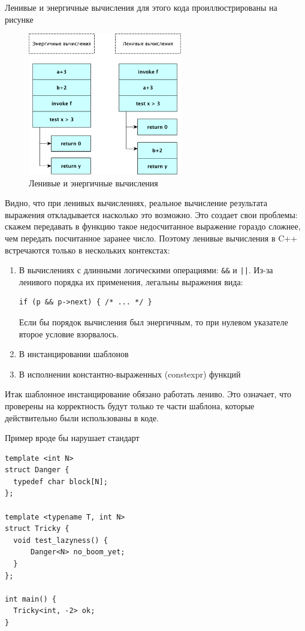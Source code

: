 \documentclass[a4paper,12pt,oneside]{article}
\begin{document}
Ленивые и энергичные вычисления для этого кода проиллюстрированы на рисунке

\begin{figure}[h!]
\centering
\includegraphics[width=0.6\textwidth]{illustrations/lazyorder-crop.pdf}
\caption{Ленивые и энергичные вычисления}
\label{fig:lazy_calc}
\end{figure}

Видно, что при ленивых вычислениях, реальное вычисление результата выражения откладывается насколько это возможно. Это создает свои проблемы: скажем передавать в функцию такое недосчитанное выражение гораздо сложнее, чем передать посчитанное заранее число. Поэтому ленивые вычисления в C++ встречаются только в нескольких контекстах:

\begin{enumerate}
\item В вычислениях с длинными логическими операциями: \lstinline!&&! и \lstinline!||!. Из-за ленивого порядка их применения, легальны выражения вида:
\begin{lstlisting}
if (p && p->next) { /* ... */ }
\end{lstlisting}
Если бы порядок вычисления был энергичным, то при нулевом указателе второе условие взорвалось.
\item В инстанцировании шаблонов
\item В исполнении константно-выраженных (constexpr) функций
\end{enumerate}

Итак шаблонное инстанцирование обязано работать лениво. Это означает, что проверены на корректность будут только те части шаблона, которые действительно были использованы в коде.

Пример вроде бы нарушает стандарт

\begin{lstlisting}
template <int N>
struct Danger {
  typedef char block[N]; 
};

template <typename T, int N>
struct Tricky {
  void test_lazyness() {
      Danger<N> no_boom_yet;
  }
};

int main() {
  Tricky<int, -2> ok;
}
\end{lstlisting}
\end{document}
